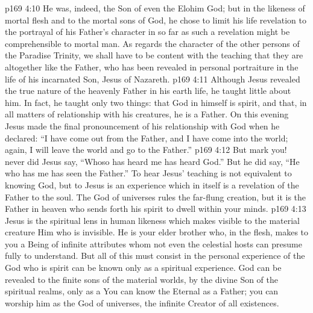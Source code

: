 \vs p169 4:10 He was, indeed, the Son of even the Elohim God; but in the likeness of mortal flesh and to the mortal sons of God, he chose to limit his life revelation to the portrayal of his Father’s character in so far as such a revelation might be comprehensible to mortal man. As regards the character of the other persons of the Paradise Trinity, we shall have to be content with the teaching that they are altogether like the Father, who has been revealed in personal portraiture in the life of his incarnated Son, Jesus of Nazareth.
\vs p169 4:11 \pc Although Jesus revealed the true nature of the heavenly Father in his earth life, he taught little about him. In fact, he taught only two things: that God in himself is spirit, and that, in all matters of relationship with his creatures, he is a Father. On this evening Jesus made the final pronouncement of his relationship with God when he declared: \textcolor{ubdarkred}{“I have come out from the Father, and I have come into the world; again, I will leave the world and go to the Father.”}
\vs p169 4:12 But mark you! never did Jesus say, “Whoso has heard me has heard God.” But he did say, \textcolor{ubdarkred}{“He who has  me has seen the Father.”} To hear Jesus’ teaching is not equivalent to knowing God, but to  Jesus is an experience which in itself is a revelation of the Father to the soul. The God of universes rules the far\hyp{}flung creation, but it is the Father in heaven who sends forth his spirit to dwell within your minds.
\vs p169 4:13 Jesus is the spiritual lens in human likeness which makes visible to the material creature Him who is invisible. He is your elder brother who, in the flesh, makes  to you a Being of infinite attributes whom not even the celestial hosts can presume fully to understand. But all of this must consist in the personal experience of the  God who is spirit can be known only as a spiritual experience. God can be revealed to the finite sons of the material worlds, by the divine Son of the spiritual realms, only as a  You can know the Eternal as a Father; you can worship him as the God of universes, the infinite Creator of all existences.
